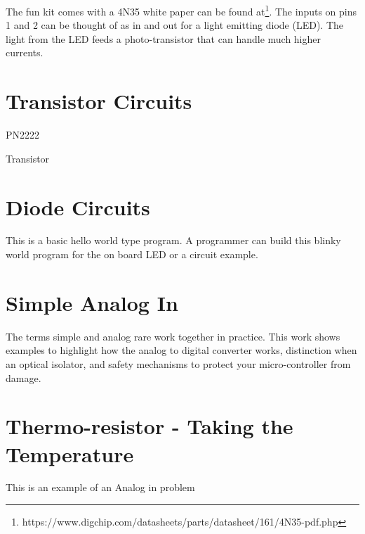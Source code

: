 \documentclass{article}
\begin{document}
The fun kit comes with a 4N35 white paper can be found at\footnote{https://www.digchip.com/datasheets/parts/datasheet/161/4N35-pdf.php}. The inputs on pins 1 and 2 can be thought of as in and out for a light emitting diode (LED).  The light from the LED feeds a photo-transistor that can handle much higher currents. 


\section{Transistor Circuits} %
\label{sec:transistor_circuits}

PN2222

Transistor



\section{Diode Circuits} %
\label{sec:diode_circuits}

This is a basic hello world type program.  A programmer can build this blinky world program for the on board LED or a circuit example.



\section{Simple Analog In} %
\label{sec:simple_analog_in}

The terms simple and analog rare work together in practice.  This work shows examples to highlight how the analog to digital converter works,  distinction when an optical isolator, and safety mechanisms to protect your micro-controller from damage.



\section{Thermo-resistor - Taking the Temperature} %
\label{sec:thermo_resistor_taking_the_temperature}

This is an example of an Analog in problem


\end{document}
